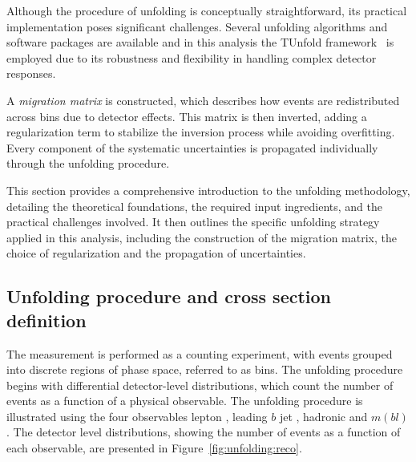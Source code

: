 Although the procedure of unfolding is conceptually straightforward, its practical implementation poses significant challenges. Several unfolding algorithms and software packages are available and in this analysis the TUnfold framework~\cite{Schmitt:2012kp} is employed due to its robustness and flexibility in handling complex detector responses.

A \textit{migration matrix} is constructed, which describes how events are redistributed across bins due to detector effects. This matrix is then inverted, adding a regularization term to stabilize the inversion process while avoiding overfitting. Every component of the systematic uncertainties is propagated individually through the unfolding procedure.

This section provides a comprehensive introduction to the unfolding methodology, detailing the theoretical foundations, the required input ingredients, and the practical challenges involved. It then outlines the specific unfolding strategy applied in this analysis, including the construction of the migration matrix, the choice of regularization and the propagation of uncertainties. 

\subsection{Unfolding procedure and cross section definition}
\label{sec:unfolding:def}
The measurement is performed as a counting experiment, with events grouped into discrete regions of phase space, referred to as bins. The unfolding procedure begins with differential detector-level distributions, which count the number of events as a function of a physical observable. 
The unfolding procedure is illustrated using the four observables lepton \pt, leading $b$ jet \pt, hadronic \Wboson \pt and $m(bl)$. The detector level distributions, showing the number of events as a function of each observable, are presented in Figure~\ref{fig:unfolding:reco}.

